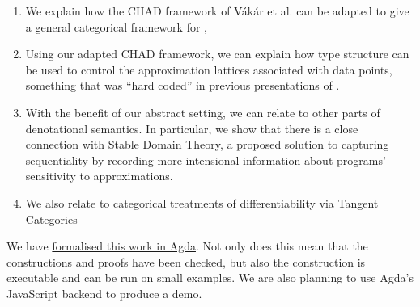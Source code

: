 \begin{enumerate}
\item We explain how the CHAD framework of Vákár et al. can be adapted to give a general categorical framework for \GPS,
\item Using our adapted CHAD framework, we can explain how type structure can be used to control the approximation lattices associated with data points, something that was ``hard coded'' in previous presentations of \GPS.
\item With the benefit of our abstract setting, we can relate \GPS to other parts of denotational semantics. In particular, we show that there is a close connection with Stable Domain Theory, a proposed solution to capturing sequentiality by recording more intensional information about programs' sensitivity to approximations.
\item We also relate \GPS to categorical treatments of differentiability via Tangent Categories 
\end{enumerate}

We have \href{https://github.com/bobatkey/approx-diff}{formalised this work in Agda}. Not only does this mean that the constructions and proofs have been checked, but also the construction is executable and can be run on small examples. We are also planning to use Agda's JavaScript backend to produce a demo. 
